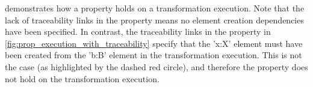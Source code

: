  demonstrates how a property holds on a transformation execution. Note that the lack of traceability links in the property means no element creation dependencies have been specified. In contrast, the traceability links in the property in \cref{fig:prop_execution_with_traceability} specify that the 'x:X' element must have been created from the 'b:B' element in the transformation execution. This is not the case (as highlighted by the dashed red circle), and therefore the property does not hold on the transformation execution.


% 
% 
% 

